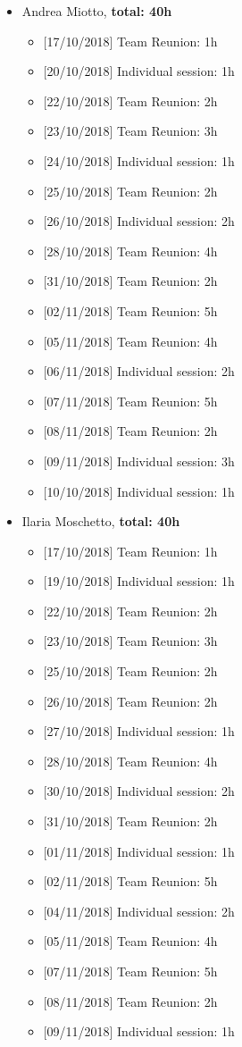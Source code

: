 \begin{itemize}
\item Andrea Miotto, \textbf{total: 40h} 
\begin{itemize}
    \item {[}17/10/2018{]} Team Reunion: 1h
    \item {[}20/10/2018{]} Individual session: 1h
    \item {[}22/10/2018{]} Team Reunion: 2h
    \item {[}23/10/2018{]} Team Reunion: 3h
    \item {[}24/10/2018{]} Individual session: 1h
    \item {[}25/10/2018{]} Team Reunion: 2h
    \item {[}26/10/2018{]} Individual session: 2h
    \item {[}28/10/2018{]} Team Reunion: 4h
    \item {[}31/10/2018{]} Team Reunion: 2h
    \item {[}02/11/2018{]} Team Reunion:  5h
    \item {[}05/11/2018{]} Team Reunion:  4h
    \item {[}06/11/2018{]} Individual session: 2h
    \item {[}07/11/2018{]} Team Reunion: 5h
    \item {[}08/11/2018{]} Team Reunion: 2h
    \item {[}09/11/2018{]} Individual session: 3h
    \item {[}10/10/2018{]} Individual session: 1h
\end{itemize}

\item Ilaria Moschetto, \textbf{total: 40h}
\begin{itemize}
    \item {[}17/10/2018{]} Team Reunion: 1h
    \item {[}19/10/2018{]} Individual session: 1h
    \item {[}22/10/2018{]} Team Reunion: 2h
    \item {[}23/10/2018{]} Team Reunion: 3h
    \item {[}25/10/2018{]} Team Reunion: 2h
    \item {[}26/10/2018{]} Team Reunion: 2h
    \item {[}27/10/2018{]} Individual session: 1h
    \item {[}28/10/2018{]} Team Reunion: 4h
    \item {[}30/10/2018{]} Individual session: 2h
    \item {[}31/10/2018{]} Team Reunion: 2h
    \item {[}01/11/2018{]} Individual session: 1h
    \item {[}02/11/2018{]} Team Reunion: 5h
    \item {[}04/11/2018{]} Individual session: 2h
    \item {[}05/11/2018{]} Team Reunion:  4h
    \item {[}07/11/2018{]} Team Reunion:  5h
    \item {[}08/11/2018{]} Team Reunion: 2h
    \item {[}09/11/2018{]} Individual session: 1h
\end{itemize}
\end{itemize}